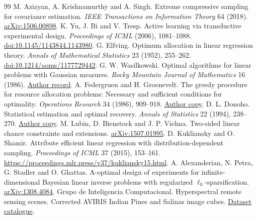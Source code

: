 \documentclass[11pt]{article}
\begin{document}
\begin{thebibliography}{99}
 M. Azizyan, A. Krishnamurthy and A. Singh. Extreme compressive sampling for covariance estimation. \emph{IEEE Transactions on Information Theory} 64 (2018). \href{https://arxiv.org/abs/1506.00898}{arXiv:1506.00898}.
 K. Yu, J. Bi and V. Tresp. Active learning via transductive experimental design. \emph{Proceedings of ICML} (2006), 1081--1088. \href{https://doi.org/10.1145/1143844.1143980}{doi:10.1145/1143844.1143980}.
 G. Elfving. Optimum allocation in linear regression theory. \emph{Annals of Mathematical Statistics} 23 (1952), 255--262. \href{https://doi.org/10.1214/aoms/1177729442}{doi:10.1214/aoms/1177729442}.
 G. W. Wasilkowski. Optimal algorithms for linear problems with Gaussian measures. \emph{Rocky Mountain Journal of Mathematics} 16 (1986). \href{https://scholars.uky.edu/en/publications/optimal-algorithms-for-linear-problems-with-gaussian-measures/}{Author record}.
 A. Federgruen and H. Groenevelt. The greedy procedure for resource allocation problems: Necessary and sufficient conditions for optimality. \emph{Operations Research} 34 (1986), 909--918. \href{https://business.columbia.edu/sites/default/files-efs/pubfiles/4071/federgruen_greedy_procedure.pdf}{Author copy}.
 D. L. Donoho. Statistical estimation and optimal recovery. \emph{Annals of Statistics} 22 (1994), 238--270. \href{https://web.stanford.edu/dept/statistics/cgi-bin/donoho/wp-content/uploads/2018/08/SEOR.pdf}{Author copy}.
 M. Lubin, D. Bienstock and J. P. Vielma. Two-sided linear chance constraints and extensions. \href{https://arxiv.org/abs/1507.01995}{arXiv:1507.01995}.
 D. Kukliansky and O. Shamir. Attribute efficient linear regression with distribution-dependent sampling. \emph{Proceedings of ICML} 37 (2015), 153--161. \url{https://proceedings.mlr.press/v37/kukliansky15.html}.
 A. Alexanderian, N. Petra, G. Stadler and O. Ghattas. A-optimal design of experiments for infinite-dimensional Bayesian linear inverse problems with regularized $\ell_0$-sparsification. \href{https://arxiv.org/abs/1308.4084}{arXiv:1308.4084}.
 Grupo de Inteligencia Computacional. Hyperspectral remote sensing scenes. Corrected AVIRIS Indian Pines and Salinas image cubes. \href{https://www.ehu.eus/ccwintco/index.php/Hyperspectral_Remote_Sensing_Scenes}{Dataset catalogue}.


\end{thebibliography}
\end{document}
